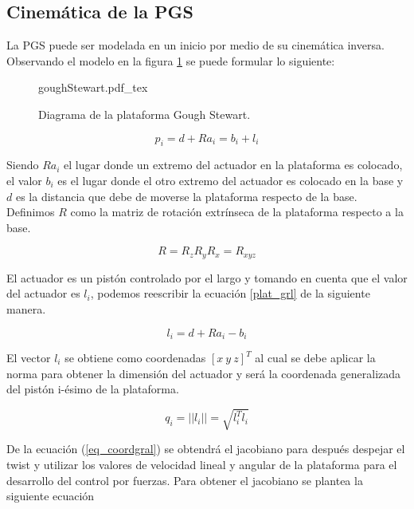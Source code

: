 \subsection{Cinemática de la PGS}
\label{section: kinematics}

La PGS puede ser modelada en un inicio por medio de su 
cinemática inversa. Observando el modelo en la figura 
\ref{fig: gough stewart diagram} se puede formular lo 
siguiente:

 \begin{figure}[ht]
    \centering
    {goughStewart.pdf_tex}
    \caption{Diagrama de la plataforma Gough Stewart.}
    \label{fig: gough stewart diagram}
\end{figure}

\begin{equation} \label{plat_grl}
p_i = d + Ra_i = b_i + l_i
\end{equation}

Siendo $Ra_i$ el lugar donde un extremo del actuador en la 
plataforma es colocado, el valor $b_i$ es el lugar donde el 
otro extremo del actuador es colocado en la base y $d$ es la 
distancia que debe de moverse la plataforma respecto de la 
base. Definimos $R$ como la matriz de rotación extrínseca de 
la plataforma respecto a la base. 

\begin{equation}
R = R_zR_yR_x = R_{xyz}
\end{equation}

El actuador es un pistón controlado por el largo y tomando 
en cuenta que el valor del actuador es $l_i$, podemos 
reescribir la ecuación \ref{plat_grl} de la siguiente 
manera.

\begin{equation}
l_i = d + Ra_i - b_i
\end{equation}

El vector $l_i$ se obtiene como coordenadas $[x\ y\ z]^T$ al 
cual se debe aplicar la norma para obtener la dimensión del 
actuador y será la coordenada generalizada del pistón 
i-ésimo de la plataforma.

\begin{equation}\label{eq_coordgral}
q_i = ||l_i|| = \sqrt{l_i^Tl_i}
\end{equation}

De la ecuación (\ref{eq_coordgral}) se obtendrá el jacobiano 
para después despejar el twist y utilizar los valores de 
velocidad lineal y angular de la plataforma para el 
desarrollo del control por fuerzas. Para obtener el 
jacobiano se plantea la siguiente ecuación

